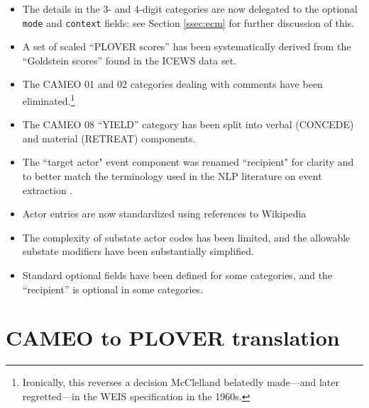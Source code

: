 \documentclass[11pt]{report}
\newcommand{\plcat}[1]{\textsf{#1}}
\newcommand{\fn}[1]{\footnote{#1}}
\begin{document}
{\begin{itemize}
\item The details in the 3- and 4-digit categories are now delegated to the optional \texttt{mode} and \texttt{context} fields: see Section \ref{ssec:ecm} for further discussion of this.  

\item A set of scaled ``PLOVER scores'' has been systematically derived from the ``Goldstein scores'' found in the ICEWS data set.

\item The CAMEO 01 and 02 categories dealing with comments have been eliminated.\fn{Ironically, this reverses a decision McClelland belatedly made---and later regretted---in the WEIS specification in the 1960s.}

\item The CAMEO 08 ``YIELD'' category has been split into verbal (\plcat{CONCEDE}) and material (\plcat{RETREAT}) components. 

\item The ``target actor" event component was renamed ``recipient" for clarity and to better match the terminology used in the NLP literature on event extraction \citep{halterman2020extracting}.

\item Actor entries are now standardized using references to Wikipedia  

\item The complexity of substate actor codes has been limited, and the allowable substate modifiers have been substantially simplified.

\item Standard optional fields have been defined for some categories, and the ``recipient'' is optional in some categories.

\end{itemize}


\section{CAMEO to PLOVER translation}\label{ssec:ctp}

}
\end{document}
